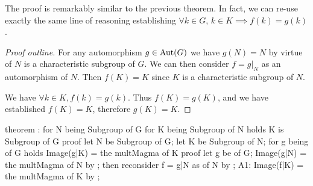 The proof is remarkably similar to the previous theorem. In fact, we can
re-use exactly the same line of reasoning establishing
$\forall k\in G$, $k\in K\implies f(k)=g(k)$.

\begin{proof}[Proof outline]
For any automorphism $g\in\operatorname{Aut}(G)$ we have $g(N)=N$ by virtue of $N$ is
a characteristic subgroup of $G$. We can then consider $f=g|_{N}$ as an
automorphism of $N$. Then $f(K)=K$ since $K$ is a characteristic
subgroup of $N$.

We have $\forall k\in K, f(k)=g(k)$. Thus $f(K)=g(K)$, and we have
established $f(K)=K$, therefore $g(K)=K$.
\end{proof}

\nwenddocs{}\endmoddef\nwstartdeflinemarkup{}\nwenddeflinemarkup
theorem :
  for N being  Subgroup of G
  for K being  Subgroup of N
  holds K is  Subgroup of G
proof
  let N be  Subgroup of G;
  let K be  Subgroup of N;
  for g being  of G holds Image(g|K) = the multMagma of K
  proof
    let g be  of G;
    Image(g|N) = the multMagma of N by ;
    then reconsider f = g|N as  of N by ;
    A1: Image(f|K) = the multMagma of K by ;


